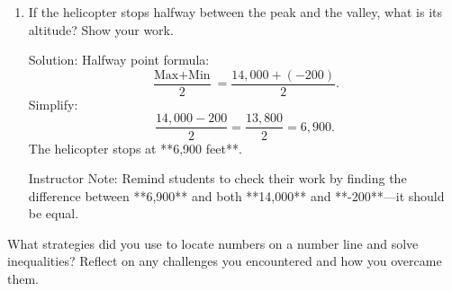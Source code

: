 \documentclass[12pt]{article}
\begin{document}
\begin{tcolorbox}[colframe=black!60, colback=white, 
coltitle=black, colbacktitle=black!15, fonttitle=\bfseries\Large, 
title=Performance Task: Mountain Heights and Depths (Part 2), halign title=center, left=10pt, right=10pt, top=10pt, bottom=60pt]
\begin{enumerate}[start=3, itemsep=5em]

    \item If the helicopter stops halfway between the peak and the valley, what is its altitude? Show your work.
    
        {\color{red} Solution: Halfway point formula:
        \[
        \frac{\text{Max} + \text{Min}}{2} = \frac{14,000 + (-200)}{2}.
        \]
        Simplify:
        \[
        \frac{14,000 - 200}{2} = \frac{13,800}{2} = 6,900.
        \]
        The helicopter stops at **6,900 feet**.}
        
        {\color{blue} Instructor Note: Remind students to check their work by finding the difference between **6,900** and both **14,000** and **-200**—it should be equal.}
\end{enumerate}
\end{tcolorbox}











\begin{tcolorbox}[colframe=black!60, colback=white, 
coltitle=black, colbacktitle=black!15, fonttitle=\bfseries\Large, 
title=Reflection, halign title=center, left=10pt, right=10pt, top=10pt, bottom=110pt]
What strategies did you use to locate numbers on a number line and solve inequalities? Reflect on any challenges you encountered and how you overcame them.
\end{tcolorbox}
\end{document}
